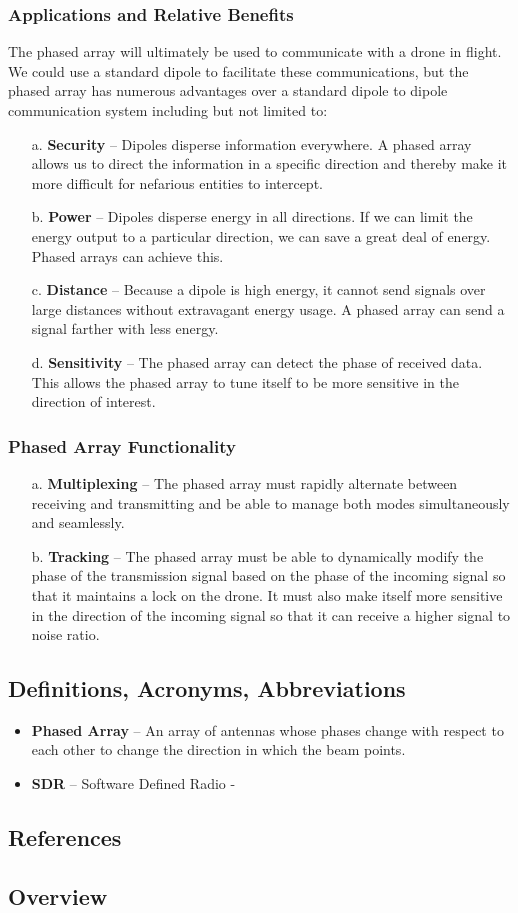 \documentclass[ProjectRequirements.tex]{subfiles}
\begin{document}
		\subsubsection{Applications and Relative Benefits}
			The phased array will ultimately be used to communicate with a drone in flight. We could use a standard dipole to facilitate these communications, but the phased array has numerous advantages over a standard dipole to dipole communication system including but not limited to:
			\begin{itemize} \itemsep1pt
				\item[a.]	\textbf{Security} -- Dipoles disperse information everywhere. A phased array allows us to direct the information in a specific direction and thereby make it more difficult for nefarious entities to intercept.
				\item[b.] 	\textbf{Power} -- Dipoles disperse energy in all directions. If we can limit the energy output to a particular direction, we can save a great deal of energy. Phased arrays can achieve this.
				\item[c.] 	\textbf{Distance} -- Because a dipole is high energy, it cannot send signals over large distances without extravagant energy usage. A phased array can send a signal farther with less energy.
 				\item[d.] 	\textbf{Sensitivity} -- The phased array can detect the phase of received data. This allows the phased array to tune itself to be more sensitive in the direction of interest.
			\end{itemize}
		\subsubsection{Phased Array Functionality}
			\begin{itemize} \itemsep-1pt
				\item[a.]	\textbf{Multiplexing} -- The phased array must rapidly alternate between receiving and transmitting and be able to manage both modes simultaneously and seamlessly.
				\item[b.] 	\textbf{Tracking} -- The phased array must be able to dynamically modify the phase of the transmission signal based on the phase of the incoming signal so that it maintains a lock on the drone. It must also make itself more sensitive in the direction of the incoming signal so that it can receive a higher signal to noise ratio.
			\end{itemize}
	\subsection{Definitions, Acronyms, Abbreviations}
		\begin{itemize}
			\item \textbf{Phased Array} -- An array of antennas whose phases change with respect to each other to change the direction in which the beam points.
			\item \textbf{SDR} -- Software Defined Radio - 
		\end{itemize}
	\subsection{References}
	\subsection{Overview}
\end{document}
